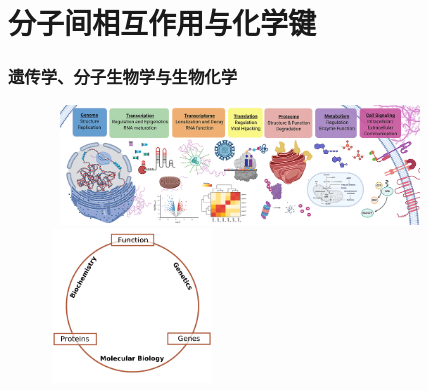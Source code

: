 \small
\section{分子间相互作用与化学键}
%
\frame
{
	\frametitle{遗传学、分子生物学与生物化学}
\begin{figure}[h!]
\centering
\vspace{-5.5pt}
\includegraphics[height=1.25in,width=4.00in,viewport=0 0 1200 400,clip]{Figures/Departmental-research-Genome-Molecular_Biology-Biochemistry.png}
\includegraphics[height=1.60in,width=1.75in,viewport=0 0 720 680,clip]{Figures/Schematic_relationship_between_biochemistry_genetics_and_molecular_biology.png}
\label{Bio-Chem-Genetics}
\end{figure}
}

